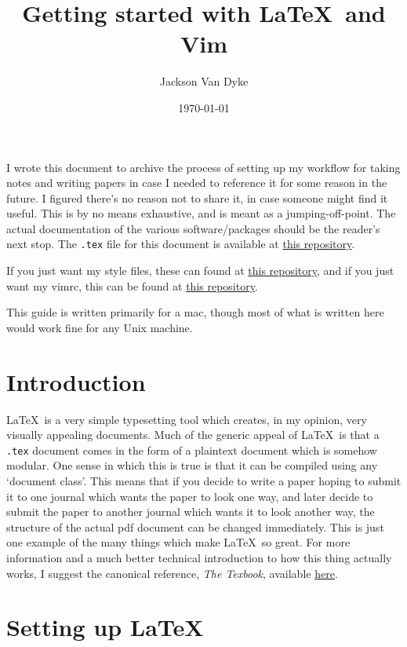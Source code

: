 \documentclass{amsart}
\begin{document}
\title{Getting started with \LaTeX\ and Vim}
\author{Jackson Van Dyke}
\date{\today}
\maketitle
\tableofcontents

I wrote this document to archive the process of setting up my workflow for taking notes
and writing papers in case I needed to reference it for some reason in the future. 
I figured there's no reason not to share it, in case someone might find it useful.
This is by no means exhaustive, and is meant as a jumping-off-point. The actual
documentation of the various software/packages should be the reader's next stop.
The \texttt{.tex} file for this document is available at 
\href{https://github.com/jacksontvd/tex/tree/master/getting_started}{this repository}.

If you just want my style files, these can found at 
\href{https://github.com/jacksontvd/tex}{this repository}, and if you just want my vimrc,
this can be found at \href{https://github.com/jacksontvd/vim}{this repository}.

This guide is written primarily for a mac, though most of what is written here would work
fine for any Unix machine.

\section{Introduction}

\LaTeX\ is a very simple typesetting tool which creates, in my opinion, very visually
appealing documents. Much of the generic appeal of \LaTeX\ is that a \texttt{.tex} document
comes in the form of a plaintext document which is somehow modular.
One sense in which this is true is that it can be compiled using any `document class'.
This means that if you decide to write a paper hoping to submit it to one journal which
wants the paper to look one way, and later decide to submit the paper to another journal
which wants it to look another way, the structure of the actual pdf document can be
changed immediately. This is just one example of the many things which make \LaTeX\ so
great. For more information and a much better technical introduction to how this thing
actually works, I suggest the canonical reference, \textit{The Texbook}, available
\href{http://www.ctex.org/documents/shredder/src/texbook.pdf}{here}.

\section{Setting up \LaTeX}
\end{document}
